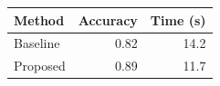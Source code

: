 \documentclass{article}
\begin{document}
\begin{center}
\begin{tabular}{lrr}
\toprule
Method & Accuracy & Time (s) \\
\midrule
Baseline & 0.82 & 14.2 \\
Proposed & 0.89 & 11.7 \\
\bottomrule
\end{tabular}
\end{center}
\end{document}
